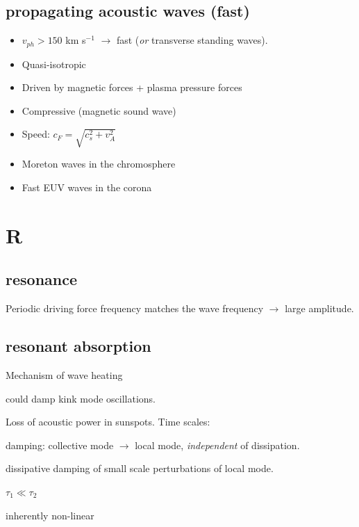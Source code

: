\documentclass[12pt]{article}
\begin{document}
\subsection*{propagating acoustic waves (fast)}
\begin{itemize}
    \item $v_{ph}>150$ km s$^{-1}$ $\rightarrow$ fast
        (\emph{or} transverse standing waves).
    \item Quasi-isotropic
    \item Driven by magnetic forces + plasma pressure forces
    \item Compressive (magnetic sound wave)
    \item Speed: $c_{F} = \sqrt{c_{s}^2 + v_{A}^2} $
    \item Moreton waves in the chromosphere
    \item Fast EUV waves in the corona
\end{itemize}


\section*{R}

\subsection*{resonance}
Periodic driving force frequency matches the wave frequency
$\rightarrow$ large amplitude.

\subsection*{resonant absorption}
\begin{itemize*}
    \item Mechanism of wave heating
    \item could damp kink mode oscillations.
    \item Loss of acoustic power in sunspots. Time scales:
        \begin{enumerate*}
            \item damping: collective mode $\rightarrow$ local mode,
                \emph{independent} of dissipation.
            \item dissipative damping of small scale perturbations of local
                mode.
        \end{enumerate*}
        $\tau_1 \ll \tau_2$
    \item inherently non-linear
\end{itemize*}
\end{document}
